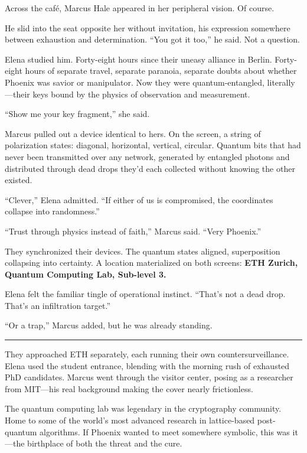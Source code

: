 \documentclass[12pt,letterpaper]{book}
\begin{document}
Across the café, Marcus Hale appeared in her peripheral vision. Of course.

He slid into the seat opposite her without invitation, his expression somewhere between exhaustion and determination. ``You got it too,'' he said. Not a question.

Elena studied him. Forty-eight hours since their uneasy alliance in Berlin. Forty-eight hours of separate travel, separate paranoia, separate doubts about whether Phoenix was savior or manipulator. Now they were quantum-entangled, literally---their keys bound by the physics of observation and measurement.

``Show me your key fragment,'' she said.

Marcus pulled out a device identical to hers. On the screen, a string of polarization states: diagonal, horizontal, vertical, circular. Quantum bits that had never been transmitted over any network, generated by entangled photons and distributed through dead drops they'd each collected without knowing the other existed.

``Clever,'' Elena admitted. ``If either of us is compromised, the coordinates collapse into randomness.''

``Trust through physics instead of faith,'' Marcus said. ``Very Phoenix.''

They synchronized their devices. The quantum states aligned, superposition collapsing into certainty. A location materialized on both screens: \textbf{ETH Zurich, Quantum Computing Lab, Sub-level 3.}

Elena felt the familiar tingle of operational instinct. ``That's not a dead drop. That's an infiltration target.''

``Or a trap,'' Marcus added, but he was already standing.

\begin{center}\rule{0.5\linewidth}{0.5pt}\end{center}

They approached ETH separately, each running their own countersurveillance. Elena used the student entrance, blending with the morning rush of exhausted PhD candidates. Marcus went through the visitor center, posing as a researcher from MIT---his real background making the cover nearly frictionless.

The quantum computing lab was legendary in the cryptography community. Home to some of the world's most advanced research in lattice-based post-quantum algorithms. If Phoenix wanted to meet somewhere symbolic, this was it---the birthplace of both the threat and the cure.
\end{document}
